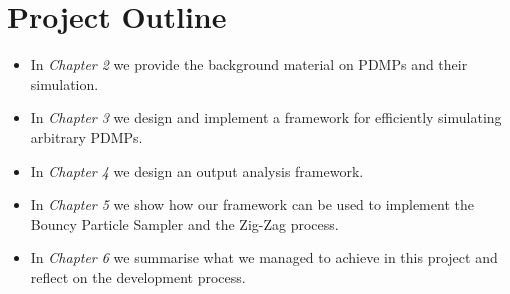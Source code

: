 \documentclass[report.tex]{subfiles}
\begin{document}
\section{Project Outline}

\begin{itemize}
  \item In \textit{Chapter 2} we provide the background material on PDMPs and
    their simulation.
  \item In \textit{Chapter 3} we design and implement a framework for efficiently
    simulating arbitrary PDMPs.
  \item In \textit{Chapter 4} we design an output analysis framework.
  \item In \textit{Chapter 5} we show how our framework can be used to implement
    the Bouncy Particle Sampler and the Zig-Zag process.
  \item In \textit{Chapter 6} we summarise what we managed to achieve in this project
    and reflect on the development process.
\end{itemize}
\end{document}
